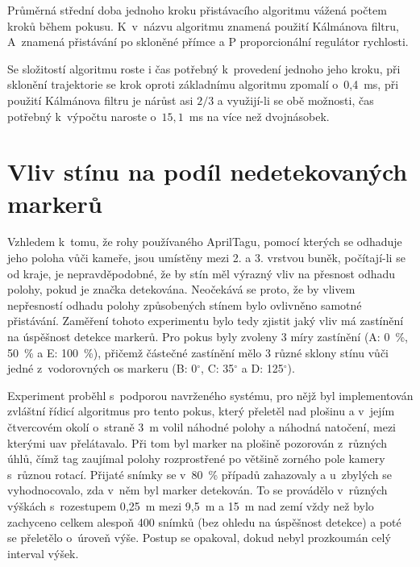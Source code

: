     \begin{table}
      \centering
      
      \caption[Průměrná střední doba jednoho kroku algoritmu]{Průměrná střední doba jednoho kroku přistávacího algoritmu vážená počtem kroků během pokusu. K~v~názvu algoritmu znamená použití Kálmánova filtru, A~znamená přistávání po skloněné přímce a P proporcionální regulátor rychlosti.}
      \label{tab:dobaKroku}
    \end{table}

    Se složitostí algoritmu roste i čas potřebný k~provedení jednoho jeho kroku, při sklonění trajektorie se krok oproti základnímu algoritmu zpomalí o~0{,}4~ms, při použití Kálmánova filtru je nárůst asi $2/3$ a využijí-li se obě možnosti, čas potřebný k~výpočtu naroste o~$15{,}1$~ms na více než dvojnásobek.
  \section{Vliv stínu na podíl nedetekovaných markerů} \label{sec:stin}
    Vzhledem k~tomu, že rohy používaného AprilTagu, pomocí kterých se odhaduje jeho poloha vůči kameře, jsou umístěny mezi 2. a 3. vrstvou buněk, počítají-li se od kraje, je nepravděpodobné, že by stín měl výrazný vliv na přesnost odhadu polohy, pokud je značka detekována. Neočekává se proto, že by vlivem nepřesností odhadu polohy způsobených stínem bylo ovlivněno samotné přistávání. Zaměření tohoto experimentu bylo tedy zjistit jaký vliv má zastínění na úspěšnost detekce markerů. Pro pokus byly zvoleny 3 míry zastínění (A: 0~\%, 50~\% a E: 100~\%), přičemž částečné zastínění mělo 3 různé sklony stínu vůči jedné z~vodorovných os markeru (B: 0$^\circ$, C: 35$^\circ$ a D: 125$^\circ$).

    Experiment proběhl s~podporou navrženého systému, pro nějž byl implementován zvláštní řídicí algoritmus pro tento pokus, který přeletěl nad plošinu a v~jejím čtvercovém okolí o~straně 3~m volil náhodné polohy a náhodná natočení, mezi kterými \acrshort{uav} přelátavalo. Při tom byl marker na plošině pozorován z~různých úhlů, čímž tag zaujímal polohy rozprostřené po většině zorného pole kamery s~různou rotací. Přijaté snímky se v~80~\% případů zahazovaly a u~zbylých se vyhodnocovalo, zda v~něm byl marker detekován. To se provádělo v~různých výškách s~rozestupem 0{,}25~m mezi 9{,}5~m a 15~m nad zemí vždy než bylo zachyceno celkem alespoň 400 snímků (bez ohledu na úspěšnost detekce) a poté se přeletělo o~úroveň výše. Postup se opakoval, dokud nebyl prozkoumán celý interval výšek. 

